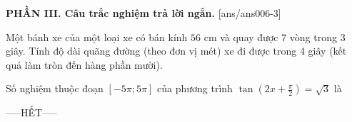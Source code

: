 \documentclass[12pt,a4paper]{article}
\begin{document}
{\bf PHẦN III. Câu trắc nghiệm trả lời ngắn.}
\setcounter{ex}{0}
[ans/ans006-3]
\begin{ex}
 Một bánh xe của một loại xe có bán kính ${56}$ cm và quay được 7 vòng trong 3 giây. Tính độ dài quãng đường (theo đơn vị mét) xe đi được trong 4 giây (kết quả làm tròn đến hàng phần mười). 

\end{ex}

\begin{ex}
 Số nghiệm thuộc đoạn $[- 5 \pi;5 \pi]$ của phương trình $\tan \left(2 x + \frac{\pi}{2}\right)=\sqrt{3}$ là

\end{ex}


 \begin{center}
-----HẾT-----
\end{center}

\newpage 
\end{document}
